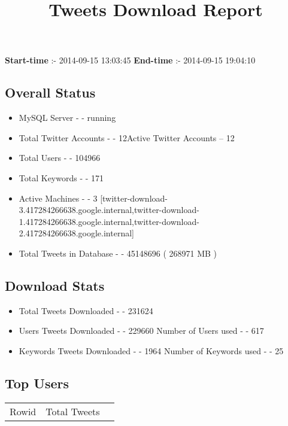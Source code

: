 \documentclass{article}\usepackage[T1]{fontenc}
\begin{document}
\title{\textbf{Tweets Download Report}}
               \date{}
                \maketitle
               \centerline{\textbf{Start-time} :- 2014-09-15 13:03:45 \hspace{40pt} \textbf{End-time} :- 2014-09-15 19:04:10}               \subsection*{Overall Status}                \begin{itemize}                \item MySQL Server - - running               \item Total Twitter Accounts - - 12\newline Active Twitter Accounts -- 12               \item Total Users - - 104966               \item Total Keywords - - 171               \item Active Machines - - 3 [twitter-download-3.417284266638.google.internal,twitter-download-1.417284266638.google.internal,twitter-download-2.417284266638.google.internal]               \item Total Tweets in Database - - 45148696 ( 268971 MB )               \end{itemize}               \subsection*{Download Stats}                \begin{itemize}                \item Total Tweets Downloaded - - 231624               \item Users Tweets Downloaded - - 229660 \newline Number of Users used - - 617               \item Keywords Tweets Downloaded - - 1964 \newline Number of Keywords used - - 25              \end{itemize}              \subsection*{Top Users}\begin{tabular}{|c|c|c|}         \hline         Rowid & Total Tweets \\ 

\end{tabular}
\end{document}
